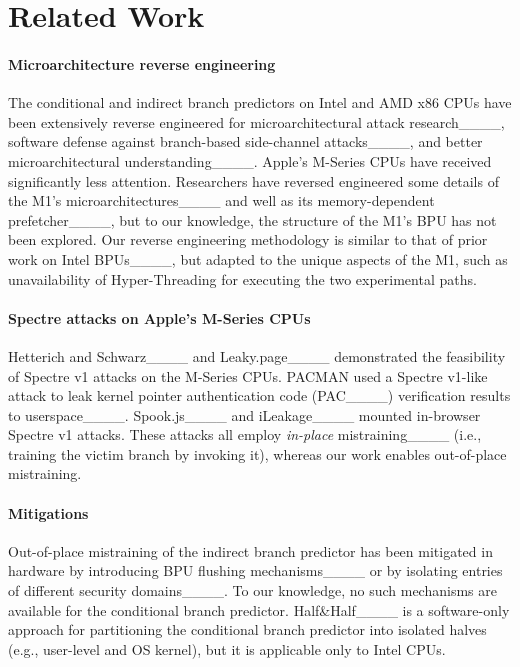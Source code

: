 \section{Related Work}
\paragraph{Microarchitecture reverse engineering}
The conditional and indirect branch predictors on Intel and AMD x86 CPUs have been extensively reverse engineered for microarchitectural attack research____, software defense against branch-based side-channel attacks____, and better microarchitectural understanding____.
Apple's M-Series CPUs have received significantly less attention.
Researchers have reversed engineered some details of the M1's microarchitectures____ and well as its memory-dependent prefetcher____, but to our knowledge, the structure of the M1's BPU has not been explored.
Our reverse engineering methodology is similar to that of prior work on Intel BPUs____, but adapted to the unique aspects of the M1, such as unavailability of Hyper-Threading for executing the two experimental paths.



\paragraph{Spectre attacks on Apple's M-Series CPUs}
Hetterich and Schwarz____ and Leaky.page____ demonstrated the feasibility of Spectre v1 attacks
on the M-Series CPUs.
PACMAN used a Spectre v1-like attack to leak kernel pointer authentication code (PAC____) verification results to userspace____.
Spook.js____ and iLeakage____ mounted in-browser Spectre v1 attacks.
These attacks all employ \emph{in-place} mistraining____ (i.e., training the victim branch by invoking it), whereas our work enables out-of-place mistraining.

\paragraph{Mitigations}
Out-of-place mistraining of the indirect branch predictor has been mitigated in hardware by introducing BPU flushing mechanisms____ or by isolating entries of different security domains____.
To our knowledge, no such mechanisms are available for the conditional branch predictor.
Half\&Half____ is a software-only approach for partitioning the conditional branch predictor into isolated halves (e.g., user-level and OS kernel), but it is applicable only to Intel CPUs.
